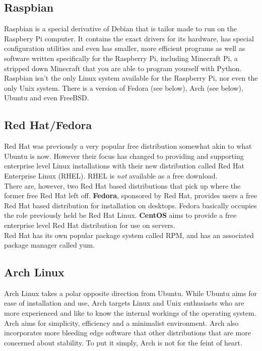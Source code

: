 \subsection{Raspbian}

Raspbian is a special derivative of Debian that is tailor made to run on the Raspbery Pi computer.  It contains the exact drivers for its hardware, has special configuration utilities and even has smaller, more efficient programs as well as software written specifically for the Raspberry Pi, including Minecraft Pi, a stripped down Minecraft that you are able to program yourself with Python.\\

Raspbian isn't the only Linux system available for the Raspberry Pi, nor even the only Unix system.  There is a version of Fedora (see below), Arch (see below), Ubuntu and even FreeBSD.

\subsection{Red Hat/Fedora}

Red Hat was previously a very popular free distribution somewhat akin to what Ubuntu is now.  However their focus has changed to providing and supporting enterprise level Linux installations with their new distribution called Red Hat Enterprise Linux (RHEL).  RHEL is \textit{not} available as a free download.\\

There are, however, two Red Hat based distributions that pick up where the former free Red Hat left off.  \textbf{Fedora}, sponsored by Red Hat, provides users a free Red Hat based distribution for installation on desktops.  Fedora basically occupies the role previously held be Red Hat Linux.  \textbf{CentOS} aims to provide a free enterprise level Red Hat distribution for use on servers.\\

Red Hat has its own popular package system called RPM, and has an associated package manager called yum.

\subsection{Arch Linux}

Arch Linux takes a polar opposite direction from Ubuntu.  While Ubuntu aims for ease of installation and use, Arch targets Linux and Unix enthusiasts who are more experienced and like to know the internal workings of the operating system.  Arch aims for simplicity, efficiency and a minimalist environment.  Arch also incorporates more bleeding edge software that other distributions that are more concerned about stability.  To put it simply, Arch is not for the feint of heart.

